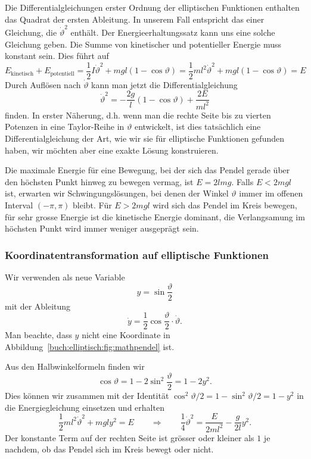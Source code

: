 Die Differentialgleichungen erster Ordnung der elliptischen Funktionen
enthalten das Quadrat der ersten Ableitung.
In unserem Fall entspricht das einer Gleichung, die $\dot{\vartheta}^2$
enthält.
Der Energieerhaltungssatz kann uns eine solche Gleichung geben.
Die Summe von kinetischer und potentieller Energie muss konstant sein.
Dies führt auf
\[
E_{\text{kinetisch}}
+
E_{\text{potentiell}}
=
\frac12I\dot{\vartheta}^2
+
mgl(1-\cos\vartheta)
=
\frac12ml^2\dot{\vartheta}^2
+
mgl(1-\cos\vartheta)
=
E
\]
Durch Auflösen nach $\dot{\vartheta}$ kann man jetzt die
Differentialgleichung
\[
\dot{\vartheta}^2
=
-
\frac{2g}{l}(1-\cos\vartheta)
+\frac{2E}{ml^2}
\]
finden.
In erster Näherung, d.h. wenn man die rechte Seite bis zu vierten
Potenzen in eine Taylor-Reihe in $\vartheta$ entwickelt,  ist dies
tatsächlich eine Differentialgleichung der Art, wie wir sie für
elliptische Funktionen gefunden haben, wir möchten aber eine exakte
Lösung konstruieren.

Die maximale Energie für eine Bewegung, bei der sich das Pendel gerade
über den höchsten Punkt hinweg zu bewegen vermag, ist 
$E=2lmg$.
Falls $E<2mgl$ ist, erwarten wir Schwingungslösungen, bei denen 
der Winkel $\vartheta$ immer im offenen Interval $(-\pi,\pi)$
bleibt.
Für $E>2mgl$ wird sich das Pendel im Kreis bewegen, für sehr grosse
Energie ist die kinetische Energie dominant, die Verlangsamung im
höchsten Punkt wird immer weniger ausgeprägt sein.

%
%
\subsubsection{Koordinatentransformation auf elliptische Funktionen}
Wir verwenden als neue Variable 
\[
y = \sin\frac{\vartheta}2
\]
mit der Ableitung
\[
\dot{y}=\frac12\cos\frac{\vartheta}{2}\cdot \dot{\vartheta}.
\]
Man beachte, dass $y$ nicht eine Koordinate in
Abbildung~\ref{buch:elliptisch:fig:mathpendel} ist.

Aus den Halbwinkelformeln finden wir
\[
\cos\vartheta
=
1-2\sin^2 \frac{\vartheta}2
=
1-2y^2.
\]
Dies können wir zusammen mit der
Identität $\cos^2\vartheta/2 = 1-\sin^2\vartheta/2 = 1-y^2$
in die Energiegleichung einsetzen und erhalten
\[
\frac12ml^2\dot{\vartheta}^2 + mgly^2 = E
\qquad\Rightarrow\qquad
\frac14 \dot{\vartheta}^2 = \frac{E}{2ml^2} - \frac{g}{2l}y^2.
\]
Der konstante Term auf der rechten Seite ist grösser oder kleiner als
$1$ je nachdem, ob das Pendel sich im Kreis bewegt oder nicht.


